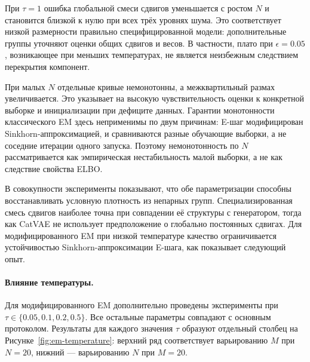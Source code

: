 При $\tau=1$ ошибка глобальной смеси сдвигов уменьшается с ростом $N$ и становится близкой
к нулю при всех трёх уровнях шума. Это соответствует низкой размерности правильно
специфицированной модели: дополнительные группы уточняют оценки общих сдвигов и весов.
В частности, плато при $\epsilon=0.05$, возникающее при меньших температурах, не является
неизбежным следствием перекрытия компонент.

При малых $N$ отдельные кривые немонотонны, а межквартильный размах увеличивается. Это
указывает на высокую чувствительность оценки к конкретной выборке и инициализации при
дефиците данных. Гарантии монотонности классического EM здесь неприменимы по двум причинам:
E-шаг модифицирован Sinkhorn-аппроксимацией, и сравниваются разные обучающие выборки, а не
соседние итерации одного запуска. Поэтому немонотонность по $N$ рассматривается как
эмпирическая нестабильность малой выборки, а не как следствие свойства ELBO.

В совокупности эксперименты показывают, что обе параметризации способны восстанавливать
условную плотность из непарных групп. Специализированная смесь сдвигов наиболее точна при
совпадении её структуры с генератором, тогда как CatVAE не использует предположение о
глобально постоянных сдвигах. Для модифицированного EM при низкой температуре качество
ограничивается устойчивостью Sinkhorn-аппроксимации E-шага, как показывает следующий опыт.

\paragraph{Влияние температуры.}
Для модифицированного EM дополнительно проведены эксперименты при
$\tau\in\{0.05,0.1,0.2,0.5\}$. Все остальные параметры совпадают с основным протоколом.
Результаты для каждого значения $\tau$ образуют отдельный столбец на
Рисунке~\ref{fig:em-temperature}: верхний ряд соответствует варьированию $M$ при $N=20$,
нижний --- варьированию $N$ при $M=20$.

